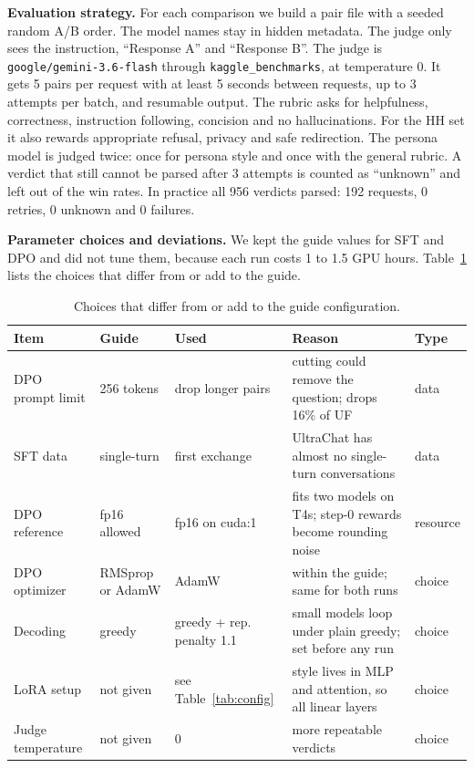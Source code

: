 \documentclass[10pt]{article}
\newcommand{\code}[1]{\texttt{\small #1}}
\begin{document}
\textbf{Evaluation strategy.} For each comparison we build a pair file with a seeded random A/B order. The model
names stay in hidden metadata. The judge only sees the instruction, ``Response A'' and ``Response B''. The judge is
\code{google/gemini-3.6-flash} through \code{kaggle\_benchmarks}, at temperature 0. It gets 5 pairs per request with
at least 5 seconds between requests, up to 3 attempts per batch, and resumable output. The rubric asks for
helpfulness, correctness, instruction following, concision and no hallucinations. For the HH set it also rewards
appropriate refusal, privacy and safe redirection. The persona model is judged twice: once for persona style and once
with the general rubric. A verdict that still cannot be parsed after 3 attempts is counted as ``unknown'' and left out of the win rates. In practice all 956 verdicts parsed: 192 requests, 0 retries, 0 unknown and 0 failures.

\textbf{Parameter choices and deviations.} We kept the guide values for SFT and DPO and did not tune them, because
each run costs 1 to 1.5 GPU hours. Table~\ref{tab:dev} lists the choices that differ from or add to the guide.

\begin{table}[h]
\centering\footnotesize
\begin{tabularx}{\textwidth}{l l l >{\raggedright\arraybackslash}X l}
\toprule
Item & Guide & Used & Reason & Type \\
\midrule
DPO prompt limit & 256 tokens & drop longer pairs & cutting could remove the question; drops 16\% of UF & data \\
SFT data & single-turn & first exchange & UltraChat has almost no single-turn conversations & data \\
DPO reference & fp16 allowed & fp16 on cuda:1 & fits two models on T4s; step-0 rewards become rounding noise & resource \\
DPO optimizer & RMSprop or AdamW & AdamW & within the guide; same for both runs & choice \\
Decoding & greedy & greedy + rep. penalty 1.1 & small models loop under plain greedy; set before any run & choice \\
LoRA setup & not given & see Table~\ref{tab:config} & style lives in MLP and attention, so all linear layers & choice \\
Judge temperature & not given & 0 & more repeatable verdicts & choice \\
\bottomrule
\end{tabularx}
\caption{Choices that differ from or add to the guide configuration.}
\label{tab:dev}
\end{table}
\end{document}
